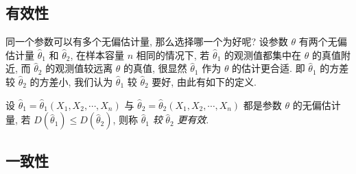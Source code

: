 \subsection{有效性}

同一个参数可以有多个无偏估计量, 那么选择哪一个为好呢? 设参数 $ \theta $ 有两个无偏估计量 $ \hat{\theta}_{1} $ 和 $ \hat{\theta}_{2}$, 
在样本容量 $ n $ 相同的情况下, 若 $ \hat{\theta}_{1} $ 的观测值都集中在 $ \theta $ 的真值附近, 
而 $\hat{\theta}_{2}$ 的观测值较远离 $\theta$ 的真值, 很显然 $\hat{\theta}_{1}$ 作为 $\theta$ 的估计更合适.
即 $\hat{\theta}_{1}$ 的方差较 $\hat{\theta}_{2}$ 的方差小, 我们认为 $\hat{\theta}_{1}$ 较 $\hat{\theta}_{2}$ 要好, 由此有如下的定义.

\begin{definition}[有效性]
    设 $ \hat{\theta}_{1}=\hat{\theta}_{1}\left(X_{1}, X_{2}, \cdots, X_{n}\right) $ 与 $ \hat{\theta}_{2}=\hat{\theta}_{2}\left(X_{1}, X_{2}, \cdots, X_{n}\right)$
    都是参数 $ \theta $ 的无偏估计量, 若 $ D\left(\hat{\theta}_{1}\right) \leqslant D\left(\hat{\theta}_{2}\right) $, 则称 $ \hat{\theta}_{1} $ \textit{较} $ \hat{\theta}_{2} $ \textit{更有效}.
\end{definition}

    

\subsection{一致性}

